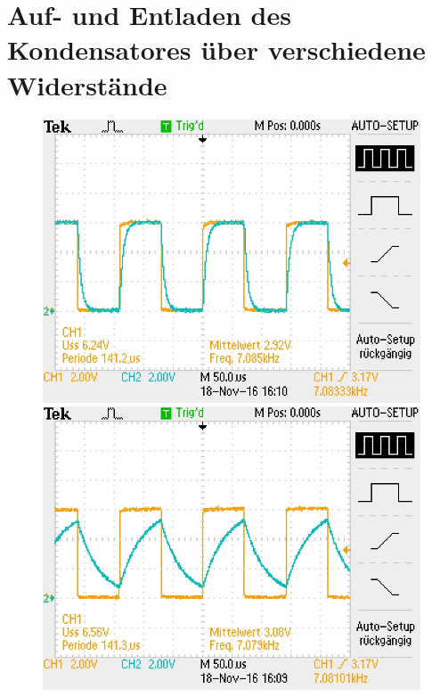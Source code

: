 \section{Auf- und Entladen des Kondensatores über verschiedene Widerstände}

\begin{figure}[t]
    \centering
    \begin{minipage}[t]{0.32\linewidth}
        \centering
        \includegraphics[width=\linewidth]{F0003TEK.jpg}
    \end{minipage}
    \begin{minipage}[t]{0.32\linewidth}
        \centering
        \includegraphics[width=\linewidth]{F0001TEK.jpg}
    \end{minipage}

\end{figure}
